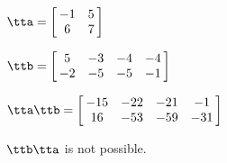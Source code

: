 {$\tta = \left[\hskip -3pt \begin{array}{cc} -1&5\\  6&7\end {array} \hskip -3pt
 \right] $ 

$\ttb =  \left[\hskip -3pt \begin{array}{cccc} 5&-3&-4&-4\\  -2&-5&-5&-1
\end{array}\hskip -3pt \right]    $}
{$\tta\ttb = \left[\hskip -3pt \begin{array}{cccc} -15&-22&-21&-1\\  16&-53&
-59&-31\end{array}\hskip -3pt \right]  $

$\ttb\tta$ is not possible.}

 

 

 